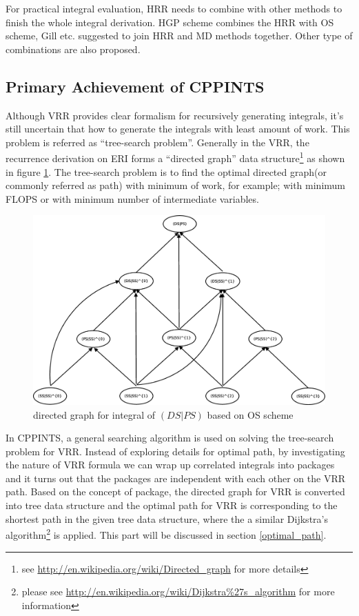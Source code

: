For practical integral evaluation, HRR needs to combine with other
methods to finish the whole integral derivation. HGP\cite{HGP} scheme combines the HRR with OS scheme,
Gill etc. \cite{gill1989efficient, gill1990efficient}suggested to join HRR and MD methods together. 
Other type of combinations are also proposed\cite{lindh1991reduced,new_hrr_Schaefer}.

\subsection{Primary Achievement of CPPINTS}
%
%
%
Although VRR provides clear formalism for recursively generating integrals, it's still 
uncertain that how to generate the integrals with least amount of work. This problem is 
referred as ``tree-search problem''\cite{HGP}. Generally in the VRR, the recurrence derivation on 
ERI forms a ``directed graph'' data structure\footnote{see 
\url{http://en.wikipedia.org/wiki/Directed_graph} for more details} as shown in figure \ref{fig:1}. 
The tree-search problem is to find the optimal directed graph(or commonly referred as path) with 
minimum of work, for example; with minimum FLOPS or with minimum number of intermediate variables. 

 \begin{figure}[htb]
 \centering
 \includegraphics[scale=0.25]{./graph.eps}
 \caption{directed graph for integral of $(DS|PS)$ based on OS scheme}
 \label{fig:1}
\end{figure}

In CPPINTS, a general searching algorithm is used on solving the tree-search problem for 
VRR. Instead of exploring details for optimal path, by
investigating the nature of VRR formula we can wrap up correlated integrals into packages
and it turns out that the packages are independent with each other on the VRR path. Based on
the concept of package, the directed graph for VRR is converted into tree data structure and the optimal
path for VRR is corresponding to the shortest path in the given tree data structure, where the
a similar Dijkstra's algorithm\footnote{please see 
\url{http://en.wikipedia.org/wiki/Dijkstra\%27s_algorithm} for more information} is applied.
This part will be discussed in section \ref{optimal_path}.

